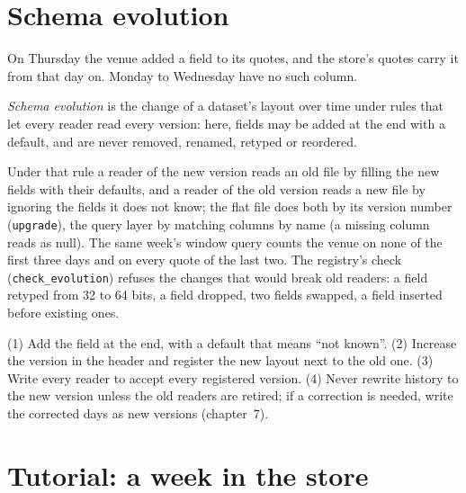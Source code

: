 \label{lst:pl:a-tick-store-on-open-formats:cpp}

\section{Schema evolution}

On Thursday the venue added a field to its quotes, and the store's quotes carry it from that day on. Monday to Wednesday have no
such column.

\begin{definition}\label{def:pl:a-tick-store-on-open-formats:evolution}
\emph{Schema evolution} is the change of a dataset's layout over time under rules that let every reader
read every version: here, fields may be added at the end with a default, and are never removed, renamed, retyped or reordered.
\end{definition}

Under that rule a reader of the new version reads an old file by filling the new fields with their defaults, and a reader of the
old version reads a new file by ignoring the fields it does not know; the flat file does both by its version number
(\texttt{upgrade}), the query layer by matching columns by name (a missing column reads as null). The same week's window query
counts the venue on none of the first three days and on every quote of the last two. The registry's check
(\texttt{check\_evolution}) refuses the changes that would break old readers: a field retyped from 32 to 64 bits, a field
dropped, two fields swapped, a field inserted before existing ones.

\begin{method}\label{met:pl:a-tick-store-on-open-formats:evolve}
(1) Add the field at the end, with a default that means ``not known''. (2) Increase the version in the header and register the new
layout next to the old one. (3) Write every reader to accept every registered version. (4) Never rewrite history to the new
version unless the old readers are retired; if a correction is needed, write the corrected days as new versions (chapter~7).
\end{method}

\section{Tutorial: a week in the store}\label{tut:pl:a-tick-store-on-open-formats:tut}

